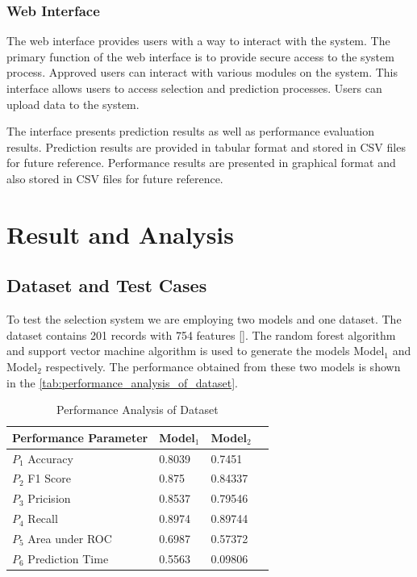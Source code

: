 \documentclass[a4paper,fleqn]{cas-dc}
\begin{document}
\subsubsection*{Web Interface}\label{subsubsec:web_interface}
The web interface provides users with a way to interact with the system. The primary function of the web interface is to provide secure access to the system process. Approved users can interact with various modules on the system. This interface allows users to access selection and prediction processes. Users can upload data to the system.

The interface presents prediction results as well as performance evaluation results. Prediction results are provided in tabular format and stored in CSV files for future reference. Performance results are presented in graphical format and also stored in CSV files for future reference.

\section{Result and Analysis}\label{sec:result_and_analysis}


\subsection{Dataset and Test Cases}\label{subsec:dataset_and_test_cases}

To test the selection system we are employing two models and one dataset. The dataset contains 201 records with 754 features []. The random forest algorithm and support vector machine algorithm is used to generate the models Model$_1$ and Model$_2$ respectively. The performance obtained from these two models is shown in the \autoref{tab:performance_analysis_of_dataset}.

\begin{table}[ht]
    \caption{Performance Analysis of Dataset}\label{tab:performance_analysis_of_dataset}
    \begin{tabular*}{\tblwidth}{@{}LLLL@{}}
        \toprule
        Performance Parameter & Model$_1$ & Model$_2$ \\
        \midrule
        $P_1$ \quad Accuracy & 0.8039 & 0.7451 \\
        $P_2$ \quad F1 Score & 0.875 & 0.84337 \\
        $P_3$ \quad Pricision & 0.8537 & 0.79546 \\
        $P_4$ \quad Recall & 0.8974 & 0.89744 \\
        $P_5$ \quad Area under ROC & 0.6987 & 0.57372 \\
        $P_6$ \quad Prediction Time & 0.5563 & 0.09806 \\
        \bottomrule
    \end{tabular*}
\end{table}
\end{document}
